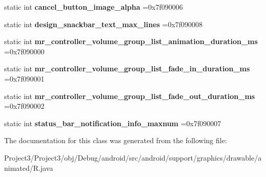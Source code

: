 \begin{DoxyCompactItemize}
static int {\bfseries cancel\+\_\+button\+\_\+image\+\_\+alpha} =0x7f090006
\item 
\mbox{\label{classandroid_1_1support_1_1graphics_1_1drawable_1_1animated_1_1R_1_1integer_a80b00e16b66989f56961f3c29b503c5b}} 
static int {\bfseries design\+\_\+snackbar\+\_\+text\+\_\+max\+\_\+lines} =0x7f090008
\item 
\mbox{\label{classandroid_1_1support_1_1graphics_1_1drawable_1_1animated_1_1R_1_1integer_a6c568d3af284580fa37a3467ca51365f}} 
static int {\bfseries mr\+\_\+controller\+\_\+volume\+\_\+group\+\_\+list\+\_\+animation\+\_\+duration\+\_\+ms} =0x7f090000
\item 
\mbox{\label{classandroid_1_1support_1_1graphics_1_1drawable_1_1animated_1_1R_1_1integer_a544dbde3d3773f6e67f48beac691090c}} 
static int {\bfseries mr\+\_\+controller\+\_\+volume\+\_\+group\+\_\+list\+\_\+fade\+\_\+in\+\_\+duration\+\_\+ms} =0x7f090001
\item 
\mbox{\label{classandroid_1_1support_1_1graphics_1_1drawable_1_1animated_1_1R_1_1integer_a2322cc3edcb849a35c198608eb3a3421}} 
static int {\bfseries mr\+\_\+controller\+\_\+volume\+\_\+group\+\_\+list\+\_\+fade\+\_\+out\+\_\+duration\+\_\+ms} =0x7f090002
\item 
\mbox{\label{classandroid_1_1support_1_1graphics_1_1drawable_1_1animated_1_1R_1_1integer_af0f7b701edd561a0ad4703dc0fa476f0}} 
static int {\bfseries status\+\_\+bar\+\_\+notification\+\_\+info\+\_\+maxnum} =0x7f090007
\end{DoxyCompactItemize}


The documentation for this class was generated from the following file\+:\begin{DoxyCompactItemize}
\item 
Project3/\+Project3/obj/\+Debug/android/src/android/support/graphics/drawable/animated/R.\+java\end{DoxyCompactItemize}
